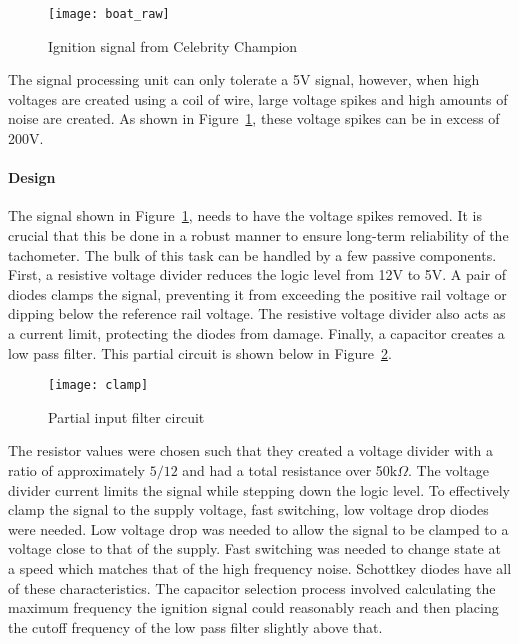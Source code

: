 \begin{figure}[H]
    \centering
    \texttt{[image: boat\_raw]}
    \caption{Ignition signal from Celebrity Champion}
    \label{fig:boat_noise}
\end{figure}

 The signal processing unit can only tolerate a 5V signal, however, when high voltages are created using a coil of wire, large voltage spikes and high amounts of noise are created. As shown in Figure~\ref{fig:boat_noise}, these voltage spikes can be in excess of 200V.

\paragraph{Design}
The signal shown in Figure~\ref{fig:boat_noise}, needs to have the voltage spikes removed. It is crucial that this be done in a robust manner to ensure long-term reliability of the tachometer. The bulk of this task can be handled by a few passive components. First, a resistive voltage divider reduces the logic level from 12V to 5V. A pair of diodes clamps the signal, preventing it from exceeding the positive rail voltage or dipping below the reference rail voltage. The resistive voltage divider also acts as a current limit, protecting the diodes from damage. Finally, a capacitor creates a low pass filter. This partial circuit is shown below in Figure~\ref{fig:clamp_filter}.

\begin{figure}[H]
    \centering
    \texttt{[image: clamp]}
    \caption{Partial input filter circuit}
    \label{fig:clamp_filter}
\end{figure}

The resistor values were chosen such that they created a voltage divider with a ratio of approximately $5/12$ and had a total resistance over 50k$\Omega$. The voltage divider current limits the signal while stepping down the logic level. To effectively clamp the signal to the supply voltage, fast switching, low voltage drop diodes were needed. Low voltage drop was needed to allow the signal to be clamped to a voltage close to that of the supply. Fast switching was needed to change state at a speed which matches that of the high frequency noise. Schottkey diodes have all of these characteristics. The capacitor selection process involved calculating the maximum frequency the ignition signal could reasonably reach and then placing the cutoff frequency of the low pass filter slightly above that.

